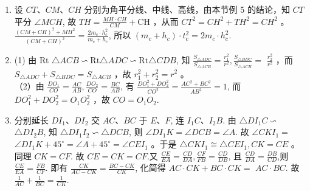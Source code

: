 \documentclass[10pt]{article}
\begin{document}
\begin{enumerate}
  \item 设 $C T 、 C M 、 C H$ 分别为角平分线、中线、高线，由本节例 5 的结论，知 $C T$ 平分 $\angle M C H$, 故 $T H=\frac{M H \cdot C H}{C M}+\mathrm{CH}$ ，从而 $C T^{2}=C H^{2}+T H^{2}=C H^{2}$ 。 $\frac{(C M+C H)^{2}+M H^{2}}{(C M+C H)^{2}}=\frac{2 m_{c} \cdot h_{c}^{2}}{m_{c}+h_{c}}$, 所以 $\left(m_{c}+h_{c}\right) \cdot t_{c}^{2}=2 m_{c} \cdot h_{c}^{2}$.
  \item (1) 由 Rt $\triangle A C B \backsim \mathrm{Rt} \triangle A D C \backsim \mathrm{Rt} \triangle C D B$, 知 $\frac{S_{\triangle A D C}}{S_{\triangle A C B}}=\frac{r_{1}^{2}}{r^{2}}, \frac{S_{\triangle B D C}}{S_{\triangle A C B}}=$ $\frac{r_{2}^{2}}{r^{2}}$ ，而 $S_{\triangle A D C}+S_{\triangle B D C}=S_{\triangle A C B}$ ，故 $r_{1}^{2}+r_{2}^{2}=r^{2}$ 。\\
（2）由 $\frac{D O_{1}}{C O}=\frac{A C}{A B}, \frac{D O_{2}}{C O}=\frac{B C}{A B}$, 有 $\frac{D O_{1}^{2}+D O_{2}^{2}}{C O^{2}}=\frac{A C^{2}+B C^{2}}{A B^{2}}=1$, 而 $D O_{1}^{2}+D O_{2}^{2}=O_{1} O_{2}^{2}$ ，故 $C O=O_{1} O_{2}$.
  \item 分别延长 $D I_{1} 、 D I_{2}$ 交 $A C 、 B C$ 于 $E 、 F$, 连 $I_{1} C 、 I_{2} B$. 由 $\triangle D I_{1} C \backsim$ $\triangle D I_{2} B$, 知 $\triangle D I_{1} I_{2} \backsim \triangle D C B$, 则 $\angle D I_{1} K=\angle D C B=\angle A$. 故 $\angle C K I_{1}=$ $\angle D I_{1} K+45^{\circ}=\angle A+45^{\circ}=\angle C E I_{1}$ 。于是 $\triangle C K I_{1} \cong \triangle C E I_{1}, C K=C E$ 。同理 $C K=C F$. 故 $C E=C K=C F$.又 $\frac{C E}{E A}=\frac{C D}{D A}, \frac{C F}{F B}=\frac{C D}{D B}$, 且 $\frac{C D}{D A}=\frac{D B}{C D}$,则 $\frac{C E}{E A}=\frac{F B}{C F}$. 即有 $\frac{C K}{A C-C K}=\frac{B C-C K}{C K}$, 化简得 $A C \cdot C K+B C \cdot C K=$ $A C \cdot B C$. 故 $\frac{1}{A C}+\frac{1}{B C}=\frac{1}{C K}$.
\end{enumerate}
\end{document}
